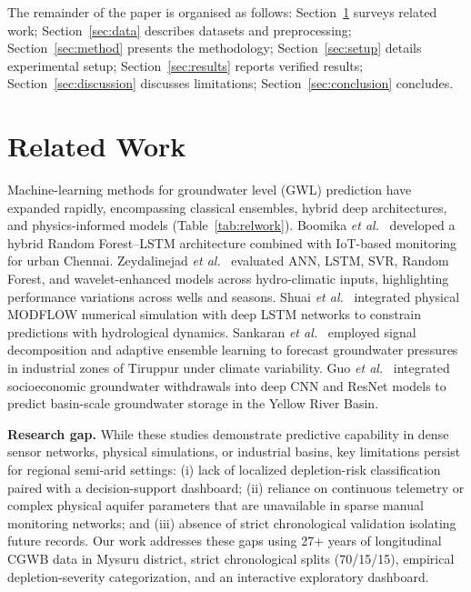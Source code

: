 \documentclass[conference]{IEEEtran}
\begin{document}
The remainder of the paper is organised as follows:
Section~\ref{sec:related} surveys related work;
Section~\ref{sec:data} describes datasets and preprocessing;
Section~\ref{sec:method} presents the methodology;
Section~\ref{sec:setup} details experimental setup;
Section~\ref{sec:results} reports verified results;
Section~\ref{sec:discussion} discusses limitations;
Section~\ref{sec:conclusion} concludes.

\section{Related Work}
\label{sec:related}

Machine-learning methods for groundwater level (GWL) prediction
have expanded rapidly, encompassing classical ensembles, hybrid
deep architectures, and physics-informed models
(Table~\ref{tab:relwork}).
Boomika \emph{et al.}\ \cite{boomika2026} developed a hybrid
Random Forest--LSTM architecture combined with IoT-based monitoring
for urban Chennai.
Zeydalinejad \emph{et al.}\ \cite{zeydalinejad2026} evaluated
ANN, LSTM, SVR, Random Forest, and wavelet-enhanced models across
hydro-climatic inputs, highlighting performance variations across
wells and seasons.
Shuai \emph{et al.}\ \cite{shuai2026} integrated physical MODFLOW
numerical simulation with deep LSTM networks to constrain predictions
with hydrological dynamics.
Sankaran \emph{et al.}\ \cite{sankaran2026} employed signal
decomposition and adaptive ensemble learning to forecast groundwater
pressures in industrial zones of Tiruppur under climate variability.
Guo \emph{et al.}\ \cite{guo2026} integrated socioeconomic
groundwater withdrawals into deep CNN and ResNet models to predict
basin-scale groundwater storage in the Yellow River Basin.

\textbf{Research gap.}
While these studies demonstrate predictive capability in dense sensor
networks, physical simulations, or industrial basins, key limitations
persist for regional semi-arid settings:
(i) lack of localized depletion-risk classification paired with
a decision-support dashboard;
(ii) reliance on continuous telemetry or complex physical aquifer
parameters that are unavailable in sparse manual monitoring networks;
and (iii) absence of strict chronological validation isolating
future records.
Our work addresses these gaps using 27+ years of longitudinal CGWB
data in Mysuru district, strict chronological splits (70/15/15),
empirical depletion-severity categorization, and an interactive
exploratory dashboard.
\end{document}

